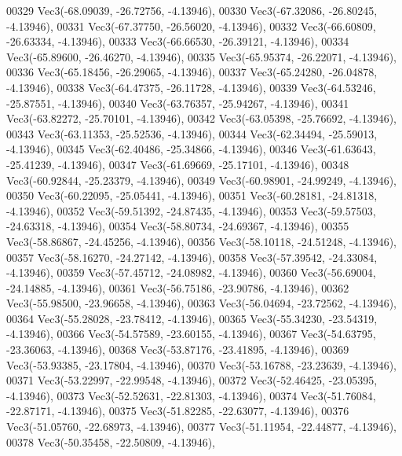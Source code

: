 \begin{DoxyCode}
00329         Vec3(-68.09039, -26.72756, -4.13946),
00330         Vec3(-67.32086, -26.80245, -4.13946),
00331         Vec3(-67.37750, -26.56020, -4.13946),
00332         Vec3(-66.60809, -26.63334, -4.13946),
00333         Vec3(-66.66530, -26.39121, -4.13946),
00334         Vec3(-65.89600, -26.46270, -4.13946),
00335         Vec3(-65.95374, -26.22071, -4.13946),
00336         Vec3(-65.18456, -26.29065, -4.13946),
00337         Vec3(-65.24280, -26.04878, -4.13946),
00338         Vec3(-64.47375, -26.11728, -4.13946),
00339         Vec3(-64.53246, -25.87551, -4.13946),
00340         Vec3(-63.76357, -25.94267, -4.13946),
00341         Vec3(-63.82272, -25.70101, -4.13946),
00342         Vec3(-63.05398, -25.76692, -4.13946),
00343         Vec3(-63.11353, -25.52536, -4.13946),
00344         Vec3(-62.34494, -25.59013, -4.13946),
00345         Vec3(-62.40486, -25.34866, -4.13946),
00346         Vec3(-61.63643, -25.41239, -4.13946),
00347         Vec3(-61.69669, -25.17101, -4.13946),
00348         Vec3(-60.92844, -25.23379, -4.13946),
00349         Vec3(-60.98901, -24.99249, -4.13946),
00350         Vec3(-60.22095, -25.05441, -4.13946),
00351         Vec3(-60.28181, -24.81318, -4.13946),
00352         Vec3(-59.51392, -24.87435, -4.13946),
00353         Vec3(-59.57503, -24.63318, -4.13946),
00354         Vec3(-58.80734, -24.69367, -4.13946),
00355         Vec3(-58.86867, -24.45256, -4.13946),
00356         Vec3(-58.10118, -24.51248, -4.13946),
00357         Vec3(-58.16270, -24.27142, -4.13946),
00358         Vec3(-57.39542, -24.33084, -4.13946),
00359         Vec3(-57.45712, -24.08982, -4.13946),
00360         Vec3(-56.69004, -24.14885, -4.13946),
00361         Vec3(-56.75186, -23.90786, -4.13946),
00362         Vec3(-55.98500, -23.96658, -4.13946),
00363         Vec3(-56.04694, -23.72562, -4.13946),
00364         Vec3(-55.28028, -23.78412, -4.13946),
00365         Vec3(-55.34230, -23.54319, -4.13946),
00366         Vec3(-54.57589, -23.60155, -4.13946),
00367         Vec3(-54.63795, -23.36063, -4.13946),
00368         Vec3(-53.87176, -23.41895, -4.13946),
00369         Vec3(-53.93385, -23.17804, -4.13946),
00370         Vec3(-53.16788, -23.23639, -4.13946),
00371         Vec3(-53.22997, -22.99548, -4.13946),
00372         Vec3(-52.46425, -23.05395, -4.13946),
00373         Vec3(-52.52631, -22.81303, -4.13946),
00374         Vec3(-51.76084, -22.87171, -4.13946),
00375         Vec3(-51.82285, -22.63077, -4.13946),
00376         Vec3(-51.05760, -22.68973, -4.13946),
00377         Vec3(-51.11954, -22.44877, -4.13946),
00378         Vec3(-50.35458, -22.50809, -4.13946),

\end{DoxyCode}
